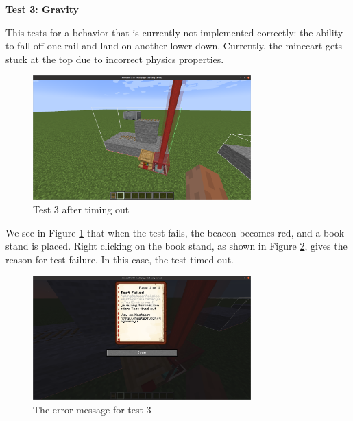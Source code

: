 \documentclass[12pt]{article}
\begin{document}
\begin{onehalfspacing}
\noindent\textbf{Test 3: Gravity}

This tests for a behavior that is currently not implemented correctly:
the ability to fall off one rail and land on another lower down.
Currently, the minecart gets stuck at the top due to incorrect physics
properties.
\begin{figure}[H] 
    \centering
    \includegraphics[width=0.75\textwidth]{media/media/image10.png} 
    \caption{Test 3 after timing out} 
    \label{fig:5_1_1_3}  
\end{figure}


We see in Figure \ref{fig:5_1_1_3} that when the test fails, the beacon becomes
red, and a book stand is placed. Right clicking on the book stand, as
shown in Figure \ref{fig:5_1_1_4}, gives the reason for test failure. In this
case, the test timed out.

\begin{figure}[H] 
    \centering
    \includegraphics[width=0.75\textwidth]{media/media/image14.png} 
    \caption{The error message for test 3} 
    \label{fig:5_1_1_4}  
\end{figure}



\end{onehalfspacing}
\end{document}
